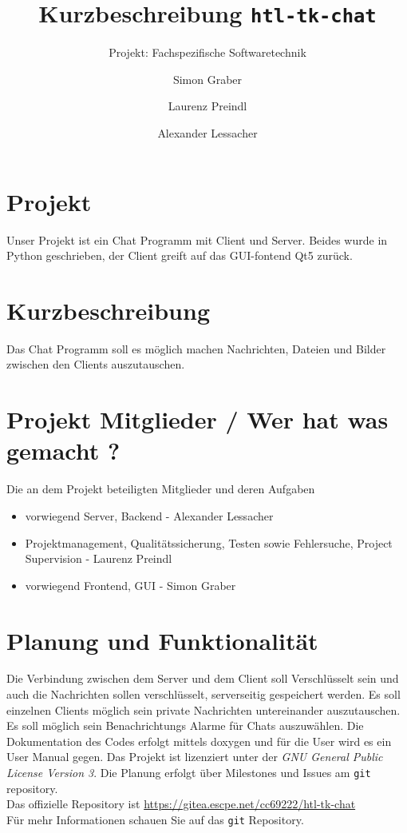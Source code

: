 \documentclass[a4paper,ngerman,headsepline]{scrreprt}
\begin{document}
\title{Kurzbeschreibung \texttt{htl-tk-chat}}
\subtitle{Projekt: Fachspezifische Softwaretechnik}
\author{Simon Graber \and Laurenz Preindl \and Alexander Lessacher}

\maketitle
\section*{Projekt}
Unser Projekt ist ein Chat Programm mit Client und Server. Beides wurde in Python geschrieben, der Client greift auf das GUI-fontend Qt5 zurück.%

\section*{Kurzbeschreibung}
Das Chat Programm soll es möglich machen Nachrichten, Dateien und Bilder zwischen den Clients auszutauschen.

\section*{Projekt Mitglieder / Wer hat was gemacht ?}
Die an dem Projekt beteiligten Mitglieder und deren Aufgaben
\begin{itemize}
 \item vorwiegend Server, Backend - Alexander Lessacher
 \item Projektmanagement, Qualitätssicherung, Testen sowie Fehlersuche, Project Supervision - Laurenz Preindl
 \item vorwiegend Frontend, GUI - Simon Graber
\end{itemize}

\section*{Planung und Funktionalität}
Die Verbindung zwischen dem Server und dem Client soll Verschlüsselt sein und auch die Nachrichten sollen verschlüsselt, serverseitig gespeichert werden. Es soll einzelnen Clients möglich sein private Nachrichten untereinander auszutauschen. Es soll möglich sein Benachrichtungs Alarme für Chats auszuwählen. Die Dokumentation des Codes erfolgt mittels doxygen und für die User wird es ein User Manual gegen.
Das Projekt ist lizenziert unter der \textit{GNU General Public License Version 3}.
Die Planung erfolgt über Milestones und Issues am \texttt{git} repository.\\
Das offizielle Repository ist \url{https://gitea.escpe.net/cc69222/htl-tk-chat}\\
Für mehr Informationen schauen Sie auf das \texttt{git} Repository.
\end{document}
